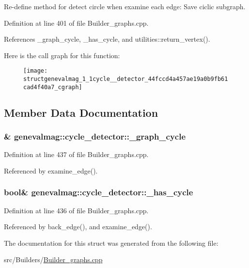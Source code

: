 Re-define method for detect circle when examine each edge: Save ciclic subgraph. 

Definition at line 401 of file Builder\_\-graphs.cpp.

References \_\-graph\_\-cycle, \_\-has\_\-cycle, and utilities::return\_\-vertex().

Here is the call graph for this function:\nopagebreak
\begin{figure}[H]
\begin{center}
\leavevmode
\texttt{[image: structgenevalmag\_1\_1cycle\_\_detector\_44fccd4a457ae19a0b9fb61cad4f40a7\_cgraph]}
\end{center}
\end{figure}


\subsection{Member Data Documentation}
\hypertarget{structgenevalmag_1_1cycle__detector_7ea4fce7ca4725c4734493281f3742b0}{
\subsubsection[{\_\-graph\_\-cycle}]{\& {\bf genevalmag::cycle\_\-detector::\_\-graph\_\-cycle}}}
\label{structgenevalmag_1_1cycle__detector_7ea4fce7ca4725c4734493281f3742b0}




Definition at line 437 of file Builder\_\-graphs.cpp.

Referenced by examine\_\-edge().\hypertarget{structgenevalmag_1_1cycle__detector_fbb82ee351ec3962b57fcf2b0d21b3b4}{
\subsubsection[{\_\-has\_\-cycle}]{\setlength{\rightskip}{0pt plus 5cm}bool\& {\bf genevalmag::cycle\_\-detector::\_\-has\_\-cycle}}}
\label{structgenevalmag_1_1cycle__detector_fbb82ee351ec3962b57fcf2b0d21b3b4}




Definition at line 436 of file Builder\_\-graphs.cpp.

Referenced by back\_\-edge(), and examine\_\-edge().

The documentation for this struct was generated from the following file:\begin{CompactItemize}
\item 
src/Builders/\hyperlink{Builder__graphs_8cpp}{Builder\_\-graphs.cpp}\end{CompactItemize}
